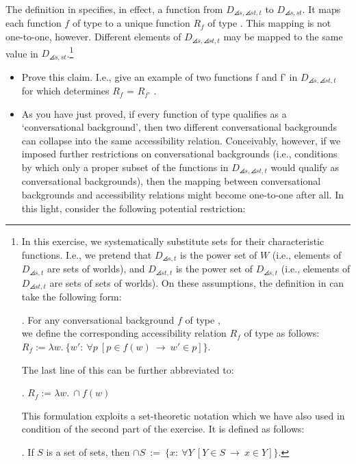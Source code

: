 \begin{exercise}\label{closure}
	
	The definition in \Last specifies, in effect, a function from
  $D_{\angles{s,\angles{st,t}}}$ to $D_{\angles{s,st}}$. It maps each
  function $f$ of type  to a unique function
  $R_{f}$ of type . This mapping is not one-to-one,
  however. Different elements of $D_{\angles{s,\angles{st,t}}}$ may be
  mapped to the same value in $D_{\angles{s,st}}$.\footnote{In this
    exercise, we systematically substitute sets for their
    characteristic functions. I.e., we pretend that $D_{\angles{s,t}}$
    is the power set of $W$ (i.e., elements of $D_{\angles{s,t}}$ are
    sets of worlds), and $D_{\angles{st,t}}$ is the power set of
    $D_{\angles{s,t}}$ (i.e., elements of $D_{\angles{st,t}}$ are sets
    of sets of worlds). On these assumptions, the definition in \Last
    can take the following form:
	
	\ex. For any conversational background $f$ of type , \\
	we define the corresponding accessibility relation $R_{f}$ of type  as follows:\\
	$R_{f} := \lambda w.\ \{w':\ \forall p\ [p\in f(w)\ \rightarrow\ w'\in p] \}$.
	
	The last line of this can be further abbreviated to:
	
	\ex. $R_{f} := \lambda w.\ \ensuremath{\cap}f(w)$
	
	This formulation exploits a set-theoretic notation which we have
  also used in condition \TextNext of the second part of the exercise.
  It is defined as follows:
	
	\ex. If $S$ is a set of sets, then $\ensuremath{\cap}S\ :=\ \{x:\ \forall Y\ [Y\in S\ \rightarrow\ x\in Y]\}$.
	
	}
	\begin{itemize}
		
  \item Prove this claim. I.e., give an example of two functions f and
    f' in $D_{\angles{s,\angles{st,t}}}$ for which \Last determines
    $R_{f}$ = $R_{f'}$ .
		
  \item As you have just proved, if every function of type
     qualifies as a `conversational
    background', then two different conversational backgrounds can
    collapse into the same accessibility relation. Conceivably,
    however, if we imposed further restrictions on conversational
    backgrounds (i.e., conditions by which only a proper subset of the
    functions in $D_{\angles{s,\angles{st,t}}}$ would qualify as
    conversational backgrounds), then the mapping between
    conversational backgrounds and accessibility relations might
    become one-to-one after all. In this light, consider the following
    potential restriction:
		

\end{itemize}
\end{exercise}
